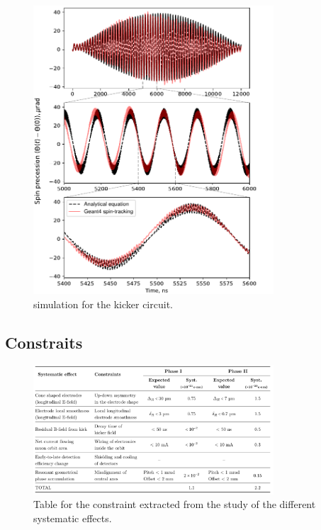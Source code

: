 \begin{refsection}
        \begin{figure}
            \centering
            \includegraphics[width = 0.8\textwidth]{Figures/muEDM/gf_systematics.png}
            \caption{\ltsp simulation for the kicker circuit.}
            \label{fig:muEDM:systematics}
        \end{figure}

    \subsection{Constraits} 
    
        \begin{figure}
            \centering
            \includegraphics[width = 0.8\textwidth]{Figures/muEDM/systematic_table.png}
            \caption{Table for the constraint extracted from the study of the different systematic effects.}
            \label{fig:muEDM:systematics:table}
        \end{figure}


\end{refsection}
